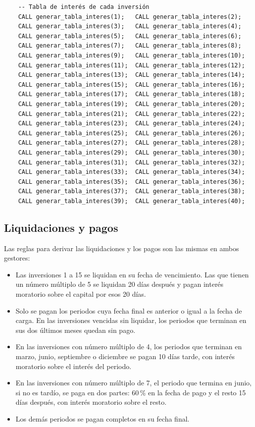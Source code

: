 \begin{verbatim}
	-- Tabla de interés de cada inversión
	CALL generar_tabla_interes(1);   CALL generar_tabla_interes(2);
	CALL generar_tabla_interes(3);   CALL generar_tabla_interes(4);
	CALL generar_tabla_interes(5);   CALL generar_tabla_interes(6);
	CALL generar_tabla_interes(7);   CALL generar_tabla_interes(8);
	CALL generar_tabla_interes(9);   CALL generar_tabla_interes(10);
	CALL generar_tabla_interes(11);  CALL generar_tabla_interes(12);
	CALL generar_tabla_interes(13);  CALL generar_tabla_interes(14);
	CALL generar_tabla_interes(15);  CALL generar_tabla_interes(16);
	CALL generar_tabla_interes(17);  CALL generar_tabla_interes(18);
	CALL generar_tabla_interes(19);  CALL generar_tabla_interes(20);
	CALL generar_tabla_interes(21);  CALL generar_tabla_interes(22);
	CALL generar_tabla_interes(23);  CALL generar_tabla_interes(24);
	CALL generar_tabla_interes(25);  CALL generar_tabla_interes(26);
	CALL generar_tabla_interes(27);  CALL generar_tabla_interes(28);
	CALL generar_tabla_interes(29);  CALL generar_tabla_interes(30);
	CALL generar_tabla_interes(31);  CALL generar_tabla_interes(32);
	CALL generar_tabla_interes(33);  CALL generar_tabla_interes(34);
	CALL generar_tabla_interes(35);  CALL generar_tabla_interes(36);
	CALL generar_tabla_interes(37);  CALL generar_tabla_interes(38);
	CALL generar_tabla_interes(39);  CALL generar_tabla_interes(40);
\end{verbatim}

\subsection{Liquidaciones y pagos}

Las reglas para derivar las liquidaciones y los pagos son las mismas en ambos gestores:

\begin{itemize}
	\item Las inversiones 1 a 15 se liquidan en su fecha de vencimiento. Las que tienen un número múltiplo de 5 se liquidan 20 días después y pagan interés moratorio sobre el capital por esos 20 días.
	\item Solo se pagan los periodos cuya fecha final es anterior o igual a la fecha de carga. En las inversiones vencidas sin liquidar, los periodos	que terminan en sus dos últimos meses quedan sin pago.
	\item En las inversiones con número múltiplo de 4, los periodos que	terminan en marzo, junio, septiembre o diciembre se pagan 10 días tarde,	con interés moratorio sobre el interés del periodo.
	\item En las inversiones con número múltiplo de 7, el periodo que termina en junio, si no es tardío, se paga en dos partes: 60\,\% en la fecha de pago y el resto 15 días después, con interés moratorio sobre el resto.
	\item Los demás periodos se pagan completos en su fecha final.
\end{itemize}

